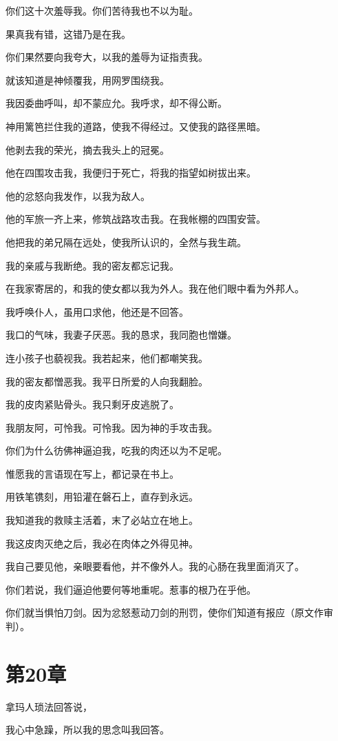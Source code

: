 \documentclass[12pt,oneside]{book}
\begin{document}
你们这十次羞辱我。你们苦待我也不以为耻。

果真我有错，这错乃是在我。

你们果然要向我夸大，以我的羞辱为证指责我。

就该知道是神倾覆我，用网罗围绕我。

我因委曲呼叫，却不蒙应允。我呼求，却不得公断。

神用篱笆拦住我的道路，使我不得经过。又使我的路径黑暗。

他剥去我的荣光，摘去我头上的冠冕。

他在四围攻击我，我便归于死亡，将我的指望如树拔出来。

他的忿怒向我发作，以我为敌人。

他的军旅一齐上来，修筑战路攻击我。在我帐棚的四围安营。

他把我的弟兄隔在远处，使我所认识的，全然与我生疏。

我的亲戚与我断绝。我的密友都忘记我。

在我家寄居的，和我的使女都以我为外人。我在他们眼中看为外邦人。

我呼唤仆人，虽用口求他，他还是不回答。

我口的气味，我妻子厌恶。我的恳求，我同胞也憎嫌。

连小孩子也藐视我。我若起来，他们都嘲笑我。

我的密友都憎恶我。我平日所爱的人向我翻脸。

我的皮肉紧贴骨头。我只剩牙皮逃脱了。

我朋友阿，可怜我。可怜我。因为神的手攻击我。

你们为什么彷佛神逼迫我，吃我的肉还以为不足呢。

惟愿我的言语现在写上，都记录在书上。

用铁笔镌刻，用铅灌在磐石上，直存到永远。

我知道我的救赎主活着，末了必站立在地上。

我这皮肉灭绝之后，我必在肉体之外得见神。

我自己要见他，亲眼要看他，并不像外人。我的心肠在我里面消灭了。

你们若说，我们逼迫他要何等地重呢。惹事的根乃在乎他。

你们就当惧怕刀剑。因为忿怒惹动刀剑的刑罚，使你们知道有报应（原文作审判）。


\chapter{第20章}
拿玛人琐法回答说，

我心中急躁，所以我的思念叫我回答。
\end{document}
